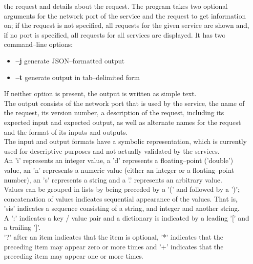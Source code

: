 the request and details about the request.
The program takes two optional arguments for the \yarp{} network port of the service and
the request to get information on; if the request is not specified, all requests for the
given service are shown and, if no port is specified, all requests for all services are
displayed.
It has two command--line options:
\begin{itemize}
\item \textbf{--j} generate JSON--formatted output
\item \textbf{--t} generate output in tab--delimited form
\end{itemize}
If neither option is present, the output is written as simple text.\\

The output consists of the \yarp{} network port that is used by the service, the name of
the request, its version number, a description of the request, including its expected
input and expected output, as well as alternate names for the request and the format of
its inputs and outputs.\\

The input and output formats have a symbolic representation, which is currently used for
descriptive purposes and not actually validated by the services.\\

An 'i' represents an integer value, a 'd' represents a floating--point ('double') value,
an 'n' represents a numeric value (either an integer or a floating--point number), an 's'
represents a string and a '.' represents an arbitrary value.\\

Values can be grouped in lists by being preceded by a '(' and followed by a ')';
concatenation of values indicates sequential appearance of the values.
That is, 'sis' indicates a sequence consisting of a string, and integer and another
string.\\

A ':' indicates a key / value pair and a dictionary is indicated by a leading '[' and a
trailing ']'.\\

'?' after an item indicates that the item is optional, '*' indicates that the preceding
item may appear zero or more times and '+' indicates that the preceding item may appear
one or more times.\\

